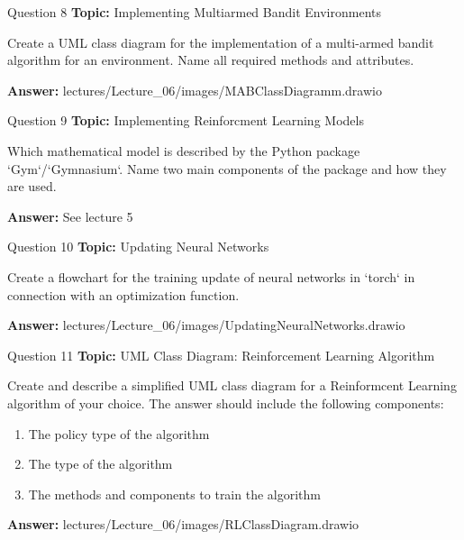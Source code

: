 \begin{frame}{Question 8}
    \textbf{Topic:} Implementing Multiarmed Bandit Environments
    \vspace{10pt}

    Create a UML class diagram for the implementation of a multi-armed bandit algorithm for an environment. Name all required methods and attributes. 
    \vspace{20pt}

    \textbf{Answer:} lectures/Lecture\_06/images/MABClassDiagramm.drawio
\end{frame}

\begin{frame}{Question 9}
    \textbf{Topic:} Implementing Reinforcment Learning Models
    \vspace{10pt}

    Which mathematical model is described by the Python package `Gym`/`Gymnasium`. Name two main components of the package and how they are used. 
    \vspace{20pt}

    \textbf{Answer:} See lecture 5
\end{frame}

\begin{frame}{Question 10}
    \textbf{Topic:} Updating Neural Networks
    \vspace{10pt}

    Create a flowchart for the training update of neural networks in `torch` in connection with an optimization function.
    \vspace{20pt}

    \textbf{Answer:} lectures/Lecture\_06/images/UpdatingNeuralNetworks.drawio
\end{frame}

\begin{frame}{Question 11}
    \textbf{Topic:} UML Class Diagram: Reinforcement Learning Algorithm
    \vspace{10pt}

    Create and describe a simplified UML class diagram for a Reinformcent Learning algorithm of your choice.
  The answer should include the following components:
  \begin{enumerate}
      \item The policy type of the algorithm
      \item The type of the algorithm
      \item The methods and components to train the algorithm
  \end{enumerate} 
    \vspace{20pt}

    \textbf{Answer:} lectures/Lecture\_06/images/RLClassDiagram.drawio
\end{frame}

